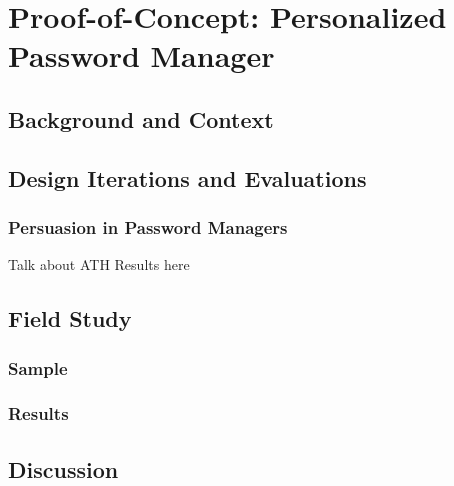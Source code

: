 \chapter[Proof-of-Concept: Personalized Password Manager]{Proof-of-Concept: Personalized Password Manager}\label{chap:pwrm}

\section{Background and Context}

\section{Design Iterations and Evaluations}

\subsection{Persuasion in Password Managers}
Talk about ATH Results here


\section{Field Study}
\subsection{Sample}
\subsection{Results}

\section{Discussion}

